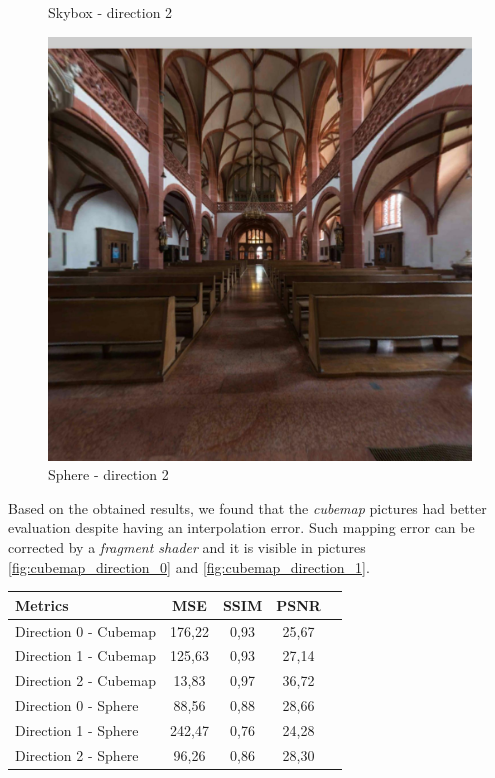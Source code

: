 \documentclass[12pt]{article}
\begin{document}
\begin{figure}[H]
\begin{minipage}[b]{0.3\textwidth}
    \caption{Skybox - direction 2}
    \label{fig:skybox_direction_2}
  \end{minipage}
  \hfill
  \begin{minipage}[b]{0.3\textwidth}
    \centering
    \includegraphics[width=1\textwidth]{../images/screenshots/Screenshot_5_Sphere.jpg}
    \caption{Sphere - direction 2}
    \label{fig:sphere_direction_2}
  \end{minipage}
\end{figure}

Based on the obtained results, we found that the \textit{cubemap} pictures had better evaluation despite having an interpolation error. Such mapping error can be corrected by a \textit{fragment shader} and it is visible in pictures \ref{fig:cubemap_direction_0} and \ref{fig:cubemap_direction_1}.

\begin{tabular}{l*{3}{c}r}
Metrics               & MSE & SSIM & PSNR \\
\hline
Direction 0 - Cubemap & 176,22 & 0,93 & 25,67 \\
Direction 1 - Cubemap & 125,63 & 0,93 & 27,14 \\
Direction 2 - Cubemap & 13,83 & 0,97 & 36,72 \\
Direction 0 - Sphere  & 88,56 & 0,88 & 28,66 \\
Direction 1 - Sphere  & 242,47 & 0,76 & 24,28 \\
Direction 2 - Sphere  & 96,26 & 0,86 & 28,30 
\label{tab:metrics_results}
\end{tabular}
\end{document}
